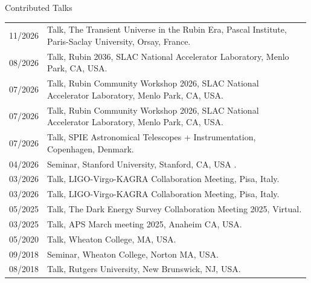 \begin{rSection}{Contributed Talks}
\setlength{\extrarowheight}{3pt}
\begin{longtable}{p{0.1\linewidth}p{0.89\linewidth}}
11/2026 & Talk, The Transient Universe in the Rubin Era, Pascal Institute, Paris-Saclay University, Orsay, France. \\ 
08/2026 & Talk, Rubin 2036, SLAC National Accelerator Laboratory, Menlo Park, CA, USA. \\ %
07/2026 & Talk, Rubin Community Workshop 2026, SLAC National Accelerator Laboratory, Menlo Park, CA, USA. \\ %
07/2026 & Talk, Rubin Community Workshop 2026, SLAC National Accelerator Laboratory, Menlo Park, CA, USA. \\
07/2026 & Talk, SPIE Astronomical Telescopes + Instrumentation, Copenhagen, Denmark. \\ %
04/2026 & Seminar, Stanford University, Stanford, CA, USA . \\
03/2026 & Talk, LIGO-Virgo-KAGRA Collaboration Meeting, Pisa, Italy. \\ %
03/2026 & Talk, LIGO-Virgo-KAGRA Collaboration Meeting, Pisa, Italy. \\ %
05/2025 & Talk, The Dark Energy Survey Collaboration Meeting 2025, Virtual. \\ %
03/2025 & Talk, APS March meeting 2025, Anaheim CA, USA. \\ %
05/2020 & Talk, Wheaton College, MA, USA. \\ %
09/2018 & Seminar, Wheaton College, Norton MA, USA. \\ %
08/2018 & Talk, Rutgers University, New Brunswick, NJ, USA. \\ %
\end{longtable}
\end{rSection}
